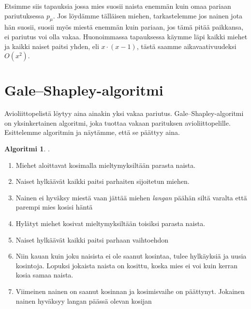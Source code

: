\documentclass[finnish]{tktltiki2}
\theoremstyle{definition}
\newtheorem{alg}[lau]{Algoritmi}
\theoremstyle{remark}
\begin{document}
Etsimme siis tapauksia jossa mies suosii naista enemmän kuin omaa pariaan pariutuksessa $p_\mu$.
Jos löydämme tälläisen miehen, tarkastelemme jos nainen jota hän suosii, suosii myös miestä enemmän kuin pariaan, jos tämä pitää paikkansa, ei pariutus voi olla vakaa.
Huonoimmassa tapauksessa käymme läpi kaikki miehet ja kaikki naiset paitsi yhden, eli $x\cdot(x-1)$, tästä saamme aikavaativuudeksi $O(x^2)$.

\section{Gale--Shapley-algoritmi}
Avioliittopelistä löytyy aina ainakin yksi vakaa pariutus. Gale--Shapley-algoritmi on yksinkertainen algoritmi, joka tuottaa vakaan parituksen avioliittopelille. Esittelemme algoritmin ja näytämme, että se päättyy aina.
\begin{alg} \cite[p. 13]{gale62a} \label{gsalg}.
\begin{enumerate}
	\item Miehet aloittavat kosimalla mieltymyksiltään parasta naista.
	\item Naiset hylkäävät kaikki paitsi parhaiten sijoitetun miehen.
	\item Nainen ei hyväksy miestä vaan jättää miehen \emph{langan} päähän siltä varalta että parempi mies kosisi häntä
	\item Hylätyt miehet kosivat mieltymyksiltään toisiksi parasta naista.
	\item Naiset hylkäävät kaikki paitsi parhaan vaihtoehdon
	\item Niin kauan kuin joku naisista ei ole saanut kosintaa, tulee hylkäyksiä ja uusia kosintoja. Lopuksi jokaista naista on kosittu, koska mies ei voi kuin kerran kosia samaa naista.
	\item Viimeinen nainen on saanut kosinnan ja kosimisvaihe on päättynyt. Jokainen nainen hyväksyy langan päässä olevan kosijan
\end{enumerate}
\end{alg}
\end{document}
